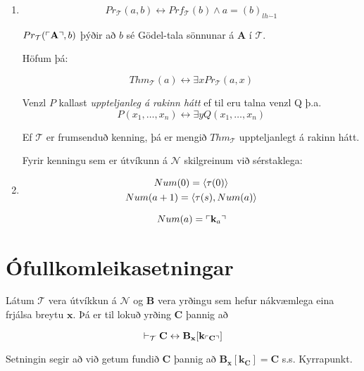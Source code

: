 \documentclass[12pt]{book}
\newcommand{\cT}{\mathcal{T}}
\newcommand{\cN}{\mathcal{N}}
\newcommand{\bA}{\mathbf{A}}
\newcommand{\bB}{\mathbf{B}}
\newcommand{\bC}{\mathbf{C}}
\newcommand{\bx}{\mathbf{x}}
\newcommand{\bk}{\mathbf{k}}
\newcommand{\xxn}{x_1, \dotsc, x_n}
\newcommand{\dda}{\dot{-}}
\DeclarePairedDelimiter{\god}{\ulcorner}{\urcorner}
\begin{document}
\begin{enumerate}[(1)]
\item  
\[Pr_{\cT} (a,b) \leftrightarrow Prf_{\cT}(b) \wedge a = (b)_{lh \dda 1} \]
 
\begin{ath}
  $Pr_{\cT}(\god{\bA},b)$ þýðir að $b$ sé Gödel-tala sönnunar á $\bA$ í $\cT$.
\end{ath}

Höfum þá:

\begin{setn}
  \[Thm_{\cT} (a) \leftrightarrow \exists x Pr_{\cT} (a,x) \]
\end{setn}

\begin{skgr}
  Venzl $P$ kallast \emph{uppteljanleg á rakinn hátt} ef til eru
  talna venzl Q þ.a.
  \[ P(\xxn) \leftrightarrow \exists y Q(\xxn) \]
\end{skgr}

\begin{setn}[Fylgisetning]
  Ef $\cT$ er frumsenduð kenning, þá er mengið
  $Thm_{\cT}$ uppteljanlegt á rakinn hátt.
\end{setn}

Fyrir kenningu sem er útvíkunn á 
$\cN$ skilgreinum við sérstaklega:

\item
  \begin{gather*}
    Num(0) = \langle\tau(0)\rangle\\
    Num(a+1) = \langle\tau(s), Num(a)\rangle
  \end{gather*}

  \begin{ath}
    \[Num(a) = \god{\bk_a} \]
  \end{ath}

\end{enumerate}


\section{Ófullkomleikasetningar}


\begin{setn}[Kyrrapunktssetning]
  Látum $\cT$ vera útvíkkun á
  $\cN$ og $\bB$ vera yrðingu sem hefur nákvæmlega
  eina frjálsa breytu $\bx$. Þá er til lokuð yrðing
  $\bC$ þannig að

  \[\vdash_{\cT} \bC \leftrightarrow \bB_{\bx} [\bk_{\god{\bC}}] \]

  Setningin segir að við getum fundið
  $\bC$ þannig að $\bB_{\bx}[\bk_{\bC}] = \bC$ s.s.
  Kyrrapunkt.
  
\end{setn}
\end{document}
